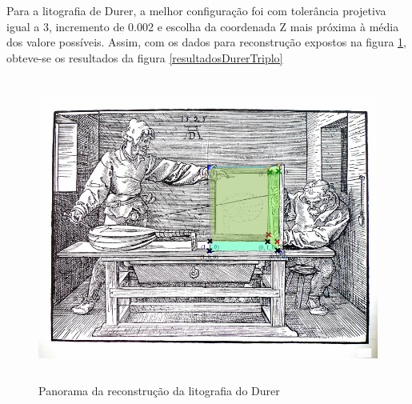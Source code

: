 			Para a litografia de Durer, a melhor configuração foi com tolerância projetiva igual a 3, incremento de 0.002 e escolha da coordenada Z mais próxima à média dos valore possíveis. Assim, com os dados para reconstrução expostos na figura \ref{printTesteDurer}, obteve-se os resultados da figura \ref{resultadosDurerTriplo}
			
			\begin{figure}[!htb]
				\centering
				\includegraphics[height=10cm]{imagens/printTesteDurer.png}
				\caption{Panorama da reconstrução da litografia do Durer}
				\label{printTesteDurer}
			\end{figure}
			
